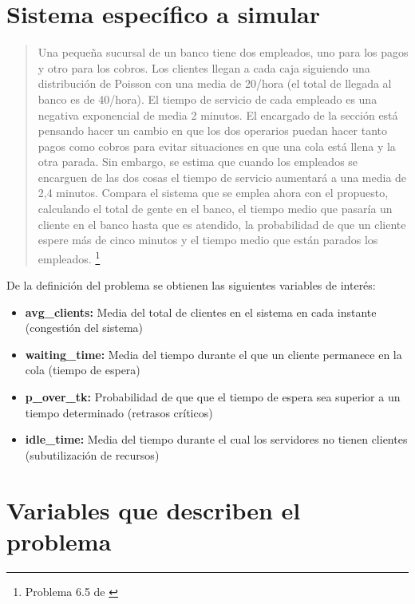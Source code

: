 \documentclass[letterpaper, 12pt]{report}
\begin{document}
\newpage

\section{Sistema específico a simular}

\begin{quote}
    Una pequeña sucursal de un banco tiene dos empleados, uno para los pagos y otro para los cobros. Los clientes llegan a 
cada caja siguiendo una distribución de Poisson con una media de 20/hora (el total de llegada al banco es de 40/hora). 
El tiempo de servicio de cada empleado es una negativa exponencial de media 2 minutos. El encargado de la sección está 
pensando hacer un cambio en que los dos operarios puedan hacer tanto pagos como cobros para evitar situaciones en que 
una cola está llena y la otra parada. Sin embargo, se estima que cuando los empleados se encarguen de las dos cosas 
el tiempo de servicio aumentará a una media de 2,4 minutos. Compara el sistema que se emplea ahora con el propuesto, 
calculando el total de gente en el banco, el tiempo medio que pasaría un cliente en el banco hasta que es atendido, 
la probabilidad de que un cliente espere más de cinco minutos y el tiempo medio que están parados los empleados. \footnote{Problema 6.5 de \cite{queue}}
\end{quote}

De la definición del problema se obtienen las siguientes variables de interés:
\begin{itemize}
    \item \textbf{avg\_clients:} Media del total de clientes en el sistema en cada instante (congestión del sistema)
    \item \textbf{waiting\_time:} Media del tiempo durante el que un cliente permanece en la cola (tiempo de espera)
    \item \textbf{p\_over\_tk:} Probabilidad de que que el tiempo de espera sea superior a un tiempo determinado (retrasos críticos)
    \item \textbf{idle\_time:} Media del tiempo durante el cual los servidores no tienen clientes (subutilización de recursos)  
\end{itemize}


\section{Variables que describen el problema}
\end{document}
